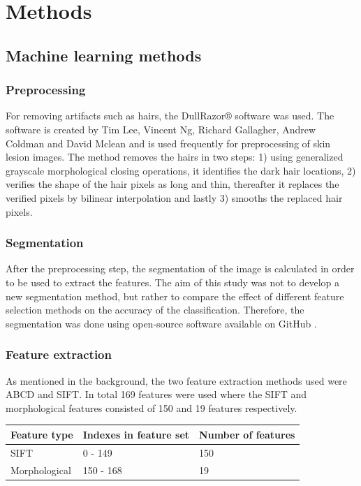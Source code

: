 \documentclass{kththesis}
\begin{document}
\chapter{Methods}

\section{Machine learning methods}

\subsection{Preprocessing}

For removing artifacts such as hairs, the DullRazor® software was used. The software is created by Tim Lee, Vincent Ng, Richard Gallagher, Andrew Coldman and David Mclean and is used frequently for preprocessing of skin lesion images. The method removes the hairs in two steps: 1) using generalized grayscale morphological closing operations, it identifies the dark hair locations, 2) verifies the shape of the hair pixels as long and thin, thereafter it replaces the verified pixels by bilinear interpolation and lastly 3) smooths the replaced hair pixels. \parencite{dermwebDullRazor} %


\subsection{Segmentation}


After the preprocessing step, the segmentation of the image is calculated in order to be used to extract the features.
The aim of this study was not to develop a new segmentation method, but rather to compare the effect of different feature selection methods on the accuracy of the classification. Therefore, the segmentation was done using open-source software available on GitHub \parencite{melanoma-classifier}. 

\subsection{Feature extraction}

As mentioned in the background, the two feature extraction methods used were ABCD and SIFT. In total 169 features were used where the SIFT and morphological features consisted of 150 and 19 features respectively.
\begin{table}[]
  \begin{tabular}{|l|l|l|}
  \hline
  Feature type  & Indexes in feature set & Number of features \\ \hline
  SIFT          & 0 - 149                & 150                \\ \hline
  Morphological & 150 - 168              & 19                 \\ \hline
  \end{tabular}
  \end{table}
\end{document}

